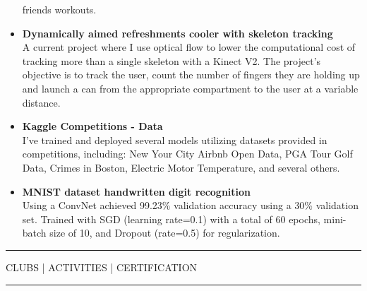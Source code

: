 \documentclass{article}
\newcommand{\makesection}[1]{\hrule\vskip1mm\uppercase{#1}\vskip1mm\hrule}
\begin{document}
\begin{itemize}[leftmargin=.35cm]
        friends workouts.
        \item \textbf{Dynamically aimed refreshments cooler with skeleton tracking} \\
        A current project where I use optical flow to lower the computational cost of tracking
        more than a single skeleton with a Kinect V2. The project's objective is to track the
        user, count the number of fingers they are holding up and launch a can from the
        appropriate compartment to the user at a variable distance.
        \item \textbf{Kaggle Competitions - Data} \\
        I've trained and deployed several models utilizing datasets provided in competitions, including:
        New Your City Airbnb Open Data, PGA Tour Golf Data, Crimes in Boston, Electric Motor Temperature,
        and several others.
        \item \textbf{MNIST dataset handwritten digit recognition} \\
        Using a ConvNet achieved 99.23\% validation accuracy using a 30\% validation set.
        Trained with SGD (learning rate=0.1) with a total of 60 epochs, mini-batch size of 10,
        and Dropout (rate=0.5) for regularization.

    \end{itemize}
    \makesection{Clubs | Activities | Certification}
\end{document}
